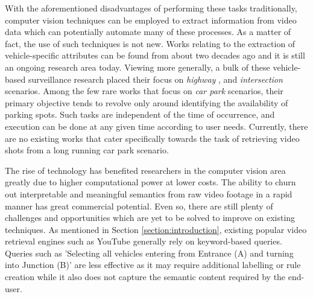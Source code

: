 With the aforementioned disadvantages of performing these tasks traditionally, computer vision techniques can be employed to extract information from video data which can potentially automate many of these processes. As a matter of fact, the use of such techniques is not new. %
Works relating to the extraction of vehicle-specific attributes can be found from about two decades ago and it is still an ongoing research area today. Viewing more generally, a bulk of these vehicle-based surveillance research placed their focus on \textit{highway} \cite{yu2017improved, cao2016vehicle, arya2016real, liu2016highway, al2016adaptive}, and  \textit{intersection} \cite{meng2017traffic, choong2017modeling, ren2018learning} scenarios. Among the few rare works \cite{shi2017study, marmol2016quickspot, ling2017identifying} that focus on \emph{car park} scenarios, their primary objective tends to revolve only around identifying the availability of parking spots. Such tasks are independent of the time of occurrence, and execution can be done at any given time according to user needs. Currently, there are no existing works that cater specifically towards the task of retrieving video shots from a long running car park scenario.


The rise of technology has benefited researchers in the computer vision area greatly due to higher computational power at lower costs. The ability to churn out interpretable and meaningful semantics from raw video footage in a rapid manner has great commercial potential. Even so, there are still plenty of challenges and opportunities which are yet to be solved to improve on existing techniques. As mentioned in Section \ref{section:introduction}, existing popular video retrieval engines such as YouTube generally rely on keyword-based queries. Queries such as 'Selecting all vehicles entering from Entrance (A) and turning into Junction (B)' are less effective as it may require additional labelling or rule creation while it also does not capture the semantic content required by the end-user.

